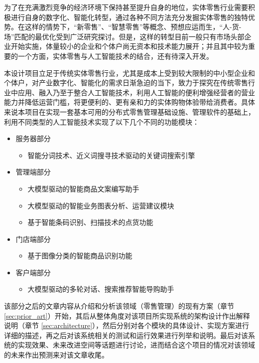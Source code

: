 为了在充满激烈竞争的经济环境下保持甚至提升自身的地位，实体零售行业需要积极进行自身的数字化、智能化转型，通过各种不同方法充分发掘实体零售的独特优势。在这样的情势下，“新零售”\cite{zhao2017new_retail,du2017new_retail}、“智慧零售”\cite{liao2019intelligent_retail}等概念、预想应运而生，“人-货-场”匹配的最优化\cite{wang2018person_good_place}受到广泛研究探讨。但是，这样的转型目前一般只有市场头部企业开始实施，体量较小的企业和个体户尚无资本和技术能力展开；并且其中较为重要的一个方面，实体零售与人工智能技术的结合，还有待深入开发。

本设计项目立足于传统实体零售行业，尤其是成本上受到较大限制的中小型企业和个体户，对产业数字化、智能化的需求日渐急迫的当下，致力于探究在传统零售行业中应用、融入乃至于整合人工智能技术，利用人工智能的便利增强经营者的营业能力并降低运营门槛，将更便利的、更有亲和力的实体购物体验带给消费者。具体来说本项目在实现一套基本可用的分布式零售管理基础设施、管理软件的基础上，利用不同类型的人工智能技术实现了以下几个不同的功能模块：

\begin{itemize}
    \item 服务器部分
    \begin{itemize}
        \item 智能分词技术、近义词搜寻技术驱动的关键词搜索引擎
    \end{itemize}
    \item 管理端部分
    \begin{itemize}
        \item 大模型驱动的智能商品文案编写助手
        \item 大模型驱动的智能业务图表分析、运营建议模块
        \item 基于智能条码识别、扫描技术的点货功能
    \end{itemize}
    \item 门店端部分
    \begin{itemize}
        \item 基于图像分类的智能商品识别功能
    \end{itemize}
    \item 客户端部分
    \begin{itemize}
        \item 大模型驱动的多轮对话、搜索推荐智能导购助手
    \end{itemize}
\end{itemize}

该部分之后的文章内容从介绍和分析该领域（零售管理）的现有方案（章节 \ref{sec:prior_art}）开始，其后从整体角度对该项目所实现系统的架构设计作出解释说明（章节 \ref{sec:architecture}），然后分别对各个模块的具体设计、实现方案进行详细的描述，再之后对该系统相关的测试和运行效果进行列举和说明。最后对该系统的实现效果、未来改进空间等话题进行讨论，进而结合这个项目的情况对该领域的未来作出预测来对该文章收尾。